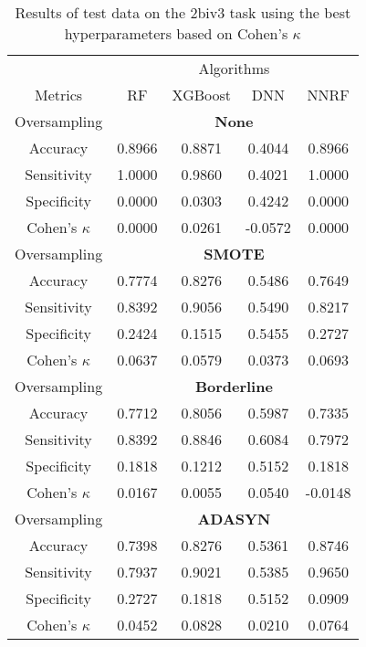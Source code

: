 \begin{table}[!htb]
\centering
\caption{Results of test data on the 2biv3 task using the best hyperparameters based on Cohen's $\kappa$}
\label{tab:2biv3_test_results}
\begin{tabular}{c | c c c c}
\hline
 & \multicolumn{4}{c}{Algorithms}\\ 
Metrics &RF & XGBoost & DNN & NNRF\\ 
\hline
Oversampling &\multicolumn{4}{|c}{\textbf{None}}\\ 
\hline
Accuracy & 0.8966 & 0.8871 & 0.4044 & 0.8966\\ 
Sensitivity & 1.0000 & 0.9860 & 0.4021 & 1.0000\\ 
Specificity & 0.0000 & 0.0303 & 0.4242 & 0.0000\\ 
Cohen's $\kappa$ & 0.0000 & 0.0261 & -0.0572 & 0.0000\\ 
\hline
Oversampling &\multicolumn{4}{|c}{\textbf{SMOTE}}\\ 
\hline
Accuracy & 0.7774 & 0.8276 & 0.5486 & 0.7649\\ 
Sensitivity & 0.8392 & 0.9056 & 0.5490 & 0.8217\\ 
Specificity & 0.2424 & 0.1515 & 0.5455 & 0.2727\\ 
Cohen's $\kappa$ & 0.0637 & 0.0579 & 0.0373 & 0.0693\\ 
\hline
Oversampling &\multicolumn{4}{|c}{\textbf{Borderline}}\\ 
\hline
Accuracy & 0.7712 & 0.8056 & 0.5987 & 0.7335\\ 
Sensitivity & 0.8392 & 0.8846 & 0.6084 & 0.7972\\ 
Specificity & 0.1818 & 0.1212 & 0.5152 & 0.1818\\ 
Cohen's $\kappa$ & 0.0167 & 0.0055 & 0.0540 & -0.0148\\ 
\hline
Oversampling &\multicolumn{4}{|c}{\textbf{ADASYN}}\\ 
\hline
Accuracy & 0.7398 & 0.8276 & 0.5361 & 0.8746\\ 
Sensitivity & 0.7937 & 0.9021 & 0.5385 & 0.9650\\ 
Specificity & 0.2727 & 0.1818 & 0.5152 & 0.0909\\ 
Cohen's $\kappa$ & 0.0452 & 0.0828 & 0.0210 & 0.0764\\ 
\hline
\end{tabular}
\end{table}


